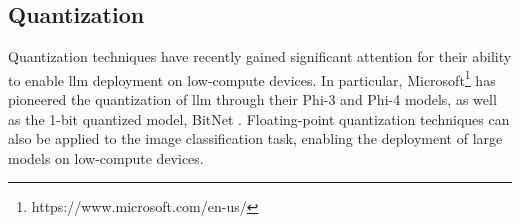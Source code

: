 \subsection{Quantization}
\label{sec:rw:quantization}

Quantization techniques have recently gained significant attention for their ability
to enable \gls*{llm} deployment on low-compute devices.
In particular, Microsoft\footnote{https://www.microsoft.com/en-us/} has pioneered the quantization of \gls*{llm}
through their Phi-3 \cite{microsoft_phi3} and Phi-4 \cite{microsoft_phi4} models,
as well as the 1-bit quantized model, BitNet \cite{microsoft_bitnet}.
Floating-point quantization techniques can also be applied to the image classification task,
enabling the deployment of large models on low-compute devices.
